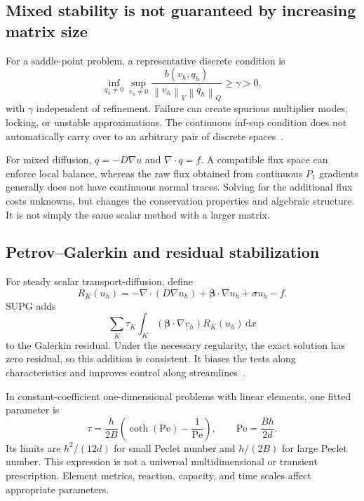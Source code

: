 \documentclass[11pt,a4paper]{article}
\newcommand{\dd}{\,\mathrm{d}}
\newcommand{\norm}[1]{\left\lVert #1\right\rVert}
\begin{document}
\subsection{Mixed stability is not guaranteed by increasing matrix size}
For a saddle-point problem, a representative discrete condition is
\begin{equation}
\inf_{q_h\ne0}\sup_{v_h\ne0}
\frac{b(v_h,q_h)}{\norm{v_h}_V\norm{q_h}_Q}\ge\gamma>0,
\end{equation}
with $\gamma$ independent of refinement. Failure can create spurious multiplier modes, locking, or unstable approximations. The continuous inf-sup condition does not automatically carry over to an arbitrary pair of discrete spaces~\cite{suli,femstokes}.

For mixed diffusion, $q=-D\nabla u$ and $\nabla\cdot q=f$. A compatible flux space can enforce local balance, whereas the raw flux obtained from continuous $P_1$ gradients generally does not have continuous normal traces. Solving for the additional flux costs unknowns, but changes the conservation properties and algebraic structure. It is not simply the same scalar method with a larger matrix.

\subsection{Petrov--Galerkin and residual stabilization}
For steady scalar transport-diffusion, define
\begin{equation}
R_K(u_h)=-\nabla\cdot(D\nabla u_h)
+\boldsymbol\beta\cdot\nabla u_h+\sigma u_h-f.
\end{equation}
SUPG adds
\begin{equation}\label{eq:supg}
\sum_K\tau_K\int_K
(\boldsymbol\beta\cdot\nabla v_h)R_K(u_h)\dd x
\end{equation}
to the Galerkin residual. Under the necessary regularity, the exact solution has zero residual, so this addition is consistent. It biases the tests along characteristics and improves control along streamlines~\cite{brooks}.

In constant-coefficient one-dimensional problems with linear elements, one fitted parameter is
\begin{equation}\label{eq:tau}
\tau=\frac{h}{2B}\left(\coth(\mathrm{Pe})-\frac1{\mathrm{Pe}}\right),
\qquad \mathrm{Pe}=\frac{Bh}{2d}.
\end{equation}
Its limits are $h^2/(12d)$ for small Peclet number and $h/(2B)$ for large Peclet number. This expression is not a universal multidimensional or transient prescription. Element metrics, reaction, capacity, and time scales affect appropriate parameters.
\end{document}
